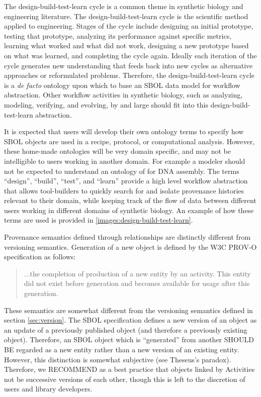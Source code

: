 The design-build-test-learn cycle is a common theme in synthetic biology and engineering literature. The design-build-test-learn cycle is the scientific method applied to engineering. Stages of the cycle include designing an initial prototype, testing that prototype, analyzing its performance against specific metrics, learning what worked and what did not work, designing a new prototype based on what was learned, and completing the cycle again. Ideally each iteration of the cycle generates new understanding that feeds back into new cycles as alternative approaches or reformulated problems. Therefore, the design-build-test-learn cycle is a \textit{de facto} ontology upon which to base an SBOL data model for workflow abstraction. Other workflow activities in synthetic biology, such as analyzing, modeling, verifying, and evolving, by and large should fit into this design-build-test-learn abstraction. 

It is expected that users will develop their own ontology terms to specify how SBOL objects are used in a recipe, protocol, or computational analysis. However, these home-made ontologies will be very domain specific, and may not be intelligible to users working in another domain. For example a modeler should not be expected to understand an ontology of   for DNA assembly. The terms ``design'', ``build'', ``test'', and ``learn'' provide a high level workflow abstraction that allows tool-builders to quickly search for and isolate provenance histories relevant to their domain, while keeping track of the flow of data between different users working in different domains of synthetic biology. An example of how these terms are used is provided in \ref{images:design-build-test-learn}.

Provenance semantics defined through  relationships are distinctly different from versioning semantics. Generation of a new object is defined by the W3C PROV-O specification as follows:
\begin{quote}
...the completion of production of a new entity by an activity. This entity did not exist before generation and becomes available for usage after this generation.
\end{quote}

These semantics are somewhat different from the versioning semantics defined in section \ref{sec:version}. The SBOL specification defines a new version of an object as an update of a previously published object (and therefore a previously existing object). Therefore, an SBOL object which is ``generated'' from another SHOULD BE regarded as a new entity rather than a new version of an existing entity. However, this distinction is somewhat subjective (see Theseus's paradox). Therefore, we RECOMMEND as a best practice that objects linked by Activities not be successive versions of each other, though this is left to the discretion of users and library developers. 

